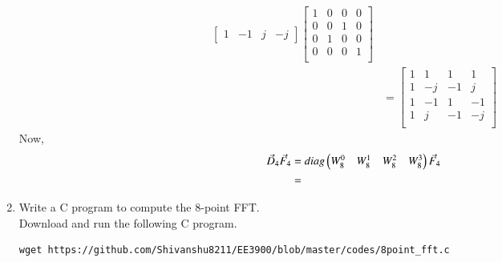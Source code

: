 \documentclass[journal,12pt,twocolumn]{IEEEtran}
\renewcommand\thesection{\arabic{section}}
\begin{document}
\begin{enumerate}[label=\arabic*.,ref=\thesection.\theenumi]
\begin{align}
\begin{bmatrix}
                                  1 & -1 & j  & -j
                             \end{bmatrix}\begin{bmatrix}
                                               1 & 0 & 0 & 0 \\
                                               0 & 0 & 1 & 0 \\
                                               0 & 1 & 0 & 0 \\
                                               0 & 0 & 0 & 1 \\
                                          \end{bmatrix}           \\
                          & =\begin{bmatrix}
                                  1 & 1  & 1  & 1  \\
                                  1 & -j & -1 & j  \\
                                  1 & -1 & 1  & -1 \\
                                  1 & j  & -1 & -j \\
                             \end{bmatrix}
           \end{align}
           Now,
           \begin{align}
                \vec{D}_{4}\vec{F}_{4} & =diag\begin{pmatrix}W_{8}^{0} & W_{8}^{1} & W_{8}^{2} & W_{8}^{3}\end{pmatrix}\vec{F}_{4} \\
                                       & =
           \end{align}
     \item Write a C program to compute the 8-point FFT. \\
           \solution Download and run the following C program.
           \begin{lstlisting}
wget https://github.com/Shivanshu8211/EE3900/blob/master/codes/8point_fft.c
           \end{lstlisting}
     \end{enumerate}
     
\end{document}
